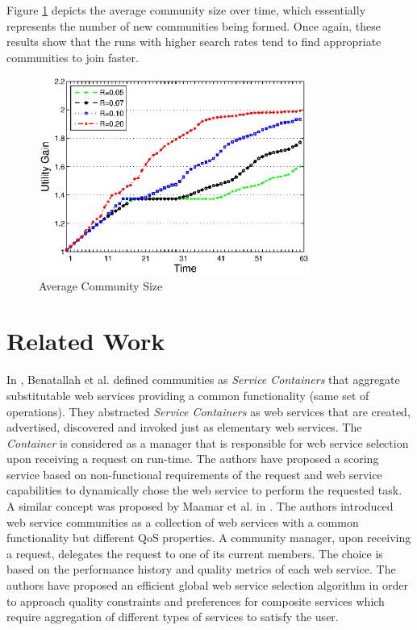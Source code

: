\documentclass[10pt,journal,cspaper,compsoc]{IEEEtran}
\begin{document}
Figure \ref{stats3} depicts the average community size over time, which essentially represents the number of new communities being formed. Once again, these results show that the runs with higher search rates tend to find appropriate communities to join faster.

\begin{figure}%
\centering
\includegraphics[width=3.5in]{figures/stats3.eps}
\caption{Average Community Size}
\label{stats3}
\end{figure}

\section{Related Work}\label{s:related_work}

In \cite{DBLP:journals/internet/BenatallahSD03}, Benatallah et al.
defined communities as \emph{Service Containers} that aggregate
substitutable web services providing a common functionality (same
set of operations). They abstracted \emph{Service Containers} as
web services that are created, advertised, discovered and invoked
just as elementary web services. The \emph{Container} is
considered as a manager that is responsible for web service
selection upon receiving a request on run-time. The authors have
proposed a scoring service based on non-functional requirements of
the request and web service capabilities to dynamically chose the
web service to perform the requested task. A similar concept was
proposed by Maamar et al. in
\cite{DBLP:journals/ijebr/MaamarSTBB09}. The authors introduced
web service communities as a collection of web services with a
common functionality but different QoS properties. A community
manager, upon receiving a request, delegates the request to one of
its current members. The choice is based on the performance
history and quality metrics of each web service. The authors have
proposed an efficient global web service selection algorithm in
order to approach quality constraints and preferences for
composite services which require aggregation of different types of
services to satisfy the user.
\end{document}
